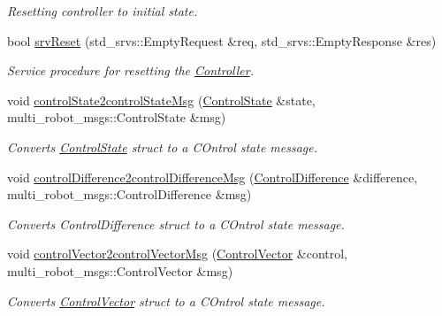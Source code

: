 \begin{DoxyCompactItemize}
\begin{DoxyCompactList}\small\item\em Resetting controller to initial state. \end{DoxyCompactList}\item 
bool \hyperlink{classController_a140aa1ee895337d776f88682640c0746}{srv\+Reset} (std\+\_\+srvs\+::\+Empty\+Request \&req, std\+\_\+srvs\+::\+Empty\+Response \&res)
\begin{DoxyCompactList}\small\item\em Service procedure for resetting the \hyperlink{classController}{Controller}. \end{DoxyCompactList}\item 
void \hyperlink{classController_a753fe3680abc7c9ba3040f6fcb638ac2}{control\+State2control\+State\+Msg} (\hyperlink{structController_1_1ControlState}{Control\+State} \&state, multi\+\_\+robot\+\_\+msgs\+::\+Control\+State \&msg)
\begin{DoxyCompactList}\small\item\em Converts \hyperlink{structController_1_1ControlState}{Control\+State} struct to a C\+Ontrol state message. \end{DoxyCompactList}\item 
void \hyperlink{classController_a866cee7328e1318e118c884a850a0e34}{control\+Difference2control\+Difference\+Msg} (\hyperlink{classController_a75a1e2f93842f65d1263f7d3c2fd8898}{Control\+Difference} \&difference, multi\+\_\+robot\+\_\+msgs\+::\+Control\+Difference \&msg)
\begin{DoxyCompactList}\small\item\em Converts Control\+Difference struct to a C\+Ontrol state message. \end{DoxyCompactList}\item 
void \hyperlink{classController_a06c1aab700c5918b76e33c35f3da8ea8}{control\+Vector2control\+Vector\+Msg} (\hyperlink{structController_1_1ControlVector}{Control\+Vector} \&control, multi\+\_\+robot\+\_\+msgs\+::\+Control\+Vector \&msg)
\begin{DoxyCompactList}\small\item\em Converts \hyperlink{structController_1_1ControlVector}{Control\+Vector} struct to a C\+Ontrol state message. \end{DoxyCompactList}\end{DoxyCompactItemize}
